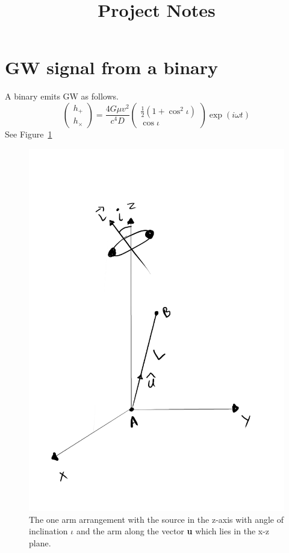 \documentclass[10pt,a4paper]{article}
\title{Project Notes}
\begin{document}
\maketitle

\section{GW signal from a binary}

A binary emits GW as follows.
\begin{equation}
\begin{pmatrix}
  h_+\\h_\times
\end{pmatrix}
= \frac{4G\mu v^2}{c^4 D}
\begin{pmatrix}
  \frac12(1+\cos^2\iota) \\
  \cos\iota
\end{pmatrix}
\exp(i\omega t)
\end{equation}
See Figure~\ref{fig:binary}

\begin{figure}[h]
\centering
\includegraphics[scale=0.25]{../Figures/diagram1.jpg}
\caption{The one arm arrangement with the source in the z-axis with
  angle of inclination $\iota$ and the arm along the vector \textbf{u}
  which lies in the x-z plane.\label{fig:binary}}
\end{figure}
\end{document}
